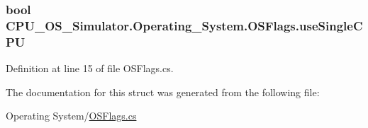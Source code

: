 \subsubsection[{use\+Single\+C\+P\+U}]{\setlength{\rightskip}{0pt plus 5cm}bool C\+P\+U\+\_\+\+O\+S\+\_\+\+Simulator.\+Operating\+\_\+\+System.\+O\+S\+Flags.\+use\+Single\+C\+P\+U}\label{struct_c_p_u___o_s___simulator_1_1_operating___system_1_1_o_s_flags_a49e0bc2c9ec783c9fb0678ace83352cf}


Definition at line 15 of file O\+S\+Flags.\+cs.



The documentation for this struct was generated from the following file\+:\begin{DoxyCompactItemize}
\item 
Operating System/\hyperlink{_o_s_flags_8cs}{O\+S\+Flags.\+cs}\end{DoxyCompactItemize}
